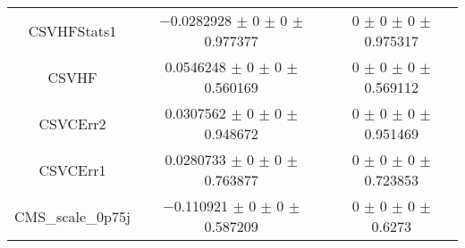 \begin{table}
\begin{tabular}{ccc}
CSVHFStats1 & \num{-0.0282928} $\pm$ \num{0} $\pm$ \num{0} $\pm$ \num{0.977377} & \num{0} $\pm$ \num{0} $\pm$ \num{0} $\pm$ \num{0.975317}\\
CSVHF & \num{0.0546248} $\pm$ \num{0} $\pm$ \num{0} $\pm$ \num{0.560169} & \num{0} $\pm$ \num{0} $\pm$ \num{0} $\pm$ \num{0.569112}\\
CSVCErr2 & \num{0.0307562} $\pm$ \num{0} $\pm$ \num{0} $\pm$ \num{0.948672} & \num{0} $\pm$ \num{0} $\pm$ \num{0} $\pm$ \num{0.951469}\\
CSVCErr1 & \num{0.0280733} $\pm$ \num{0} $\pm$ \num{0} $\pm$ \num{0.763877} & \num{0} $\pm$ \num{0} $\pm$ \num{0} $\pm$ \num{0.723853}\\
CMS\_scale\_0p75j & \num{-0.110921} $\pm$ \num{0} $\pm$ \num{0} $\pm$ \num{0.587209} & \num{0} $\pm$ \num{0} $\pm$ \num{0} $\pm$ \num{0.6273}\\
\bottomrule
\end{tabular}
\end{table}